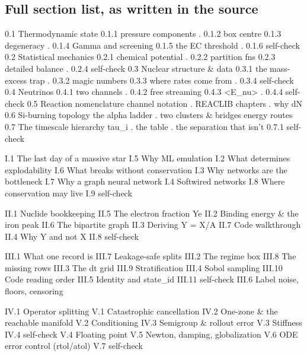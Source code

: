\subsection{Full section list, as written in the source}

\begin{srclisting}
0.1  Thermodynamic state          0.1.1 pressure components . 0.1.2 box centre
                                  0.1.3 degeneracy . 0.1.4 Gamma and screening
                                  0.1.5 the EC threshold . 0.1.6 self-check
0.2  Statistical mechanics        0.2.1 chemical potential . 0.2.2 partition fns
                                  0.2.3 detailed balance . 0.2.4 self-check
0.3  Nuclear structure & data     0.3.1 the mass-excess trap . 0.3.2 magic numbers
                                  0.3.3 where rates come from . 0.3.4 self-check
0.4  Neutrinos                    0.4.1 two channels . 0.4.2 free streaming
                                  0.4.3 <E_nu> . 0.4.4 self-check
0.5  Reaction nomenclature        channel notation . REACLIB chapters . why dN
0.6  Si-burning topology          the alpha ladder . two clusters & bridges
                                  energy routes
0.7  The timescale hierarchy      tau_i . the table . the separation that isn't
                                  0.7.1 self-check

I.1  The last day of a massive star        I.5  Why ML emulation
I.2  What determines explodability         I.6  What breaks without conservation
I.3  Why networks are the bottleneck       I.7  Why a graph neural network
I.4  Softwired networks                    I.8  Where conservation may live
                                           I.9  self-check

II.1 Nuclide bookkeeping                   II.5 The electron fraction Ye
II.2 Binding energy & the iron peak        II.6 The bipartite graph
II.3 Deriving Y = X/A                      II.7 Code walkthrough
II.4 Why Y and not X                       II.8 self-check

III.1 What one record is                   III.7  Leakage-safe splits
III.2 The regime box                       III.8  The missing rows
III.3 The dt grid                          III.9  Stratification
III.4 Sobol sampling                       III.10 Code reading order
III.5 Identity and state_id                III.11 self-check
III.6 Label noise, floors, censoring

IV.1 Operator splitting                    V.1 Catastrophic cancellation
IV.2 One-zone & the reachable manifold     V.2 Conditioning
IV.3 Semigroup & rollout error             V.3 Stiffness
IV.4 self-check                            V.4 Floating point
                                           V.5 Newton, damping, globalization
                                           V.6 ODE error control (rtol/atol)
                                           V.7 self-check


\end{srclisting}
